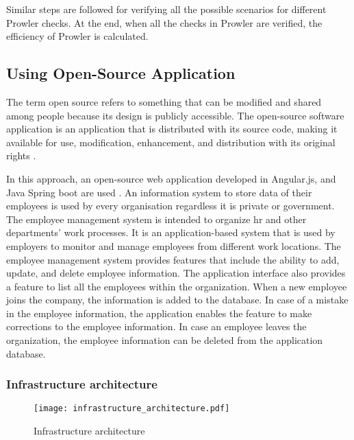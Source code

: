 \par Similar steps are followed for verifying all the possible scenarios for different Prowler checks. At the end, when all the checks in Prowler are verified, the efficiency of Prowler is calculated.

\subsection{Using Open-Source Application}

\par The term open source refers to something that can be modified and shared among people because its design is publicly accessible.
The open-source software application is an application that is distributed with its source code, making it available
for use, modification, enhancement, and distribution with
its original rights \cite{77}.

\par \par In this approach, an open-source web
application developed in Angular.js, and Java Spring boot
are used \cite{78}.
An information system to store data of their employees is used by every organisation regardless it is private or government.
The employee management system is intended to organize
\gls{hr}
and other departments' work processes.
It is an application-based system that is used by employers to monitor and manage employees from different work locations.
The employee management system provides features that include the ability to add, update, and delete employee information.
The application interface also provides a feature to list all the employees within the organization.
When a new employee joins the company, the information is added to the database.
In case of a mistake in the employee information, the application enables the feature to make corrections to the employee information.
In case an employee leaves the organization, the employee information can be deleted from the application database.

\subsubsection{Infrastructure architecture}

\begin{figure}
    \centering
    \texttt{[image: infrastructure\_architecture.pdf]}
    \caption{Infrastructure architecture}
    \label{fig:infrastructure_architecture}
\end{figure}

